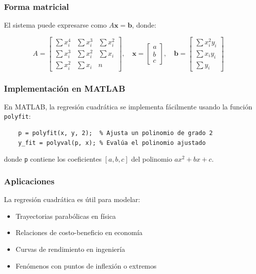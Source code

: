 \documentclass[12pt,a4paper]{article}
\begin{document}
\subsubsection{Forma matricial}

El sistema puede expresarse como $A\mathbf{x} = \mathbf{b}$, donde:

\begin{equation}
    A = \begin{bmatrix}
        \sum x_i^4 & \sum x_i^3 & \sum x_i^2 \\
        \sum x_i^3 & \sum x_i^2 & \sum x_i \\
        \sum x_i^2 & \sum x_i & n
    \end{bmatrix}, \quad
    \mathbf{x} = \begin{bmatrix} a \\ b \\ c \end{bmatrix}, \quad
    \mathbf{b} = \begin{bmatrix} \sum x_i^2 y_i \\ \sum x_i y_i \\ \sum y_i \end{bmatrix}
\end{equation}

\subsubsection{Implementación en MATLAB}

En MATLAB, la regresión cuadrática se implementa fácilmente usando la función \texttt{polyfit}:

\begin{verbatim}
    p = polyfit(x, y, 2);  % Ajusta un polinomio de grado 2
    y_fit = polyval(p, x); % Evalúa el polinomio ajustado
\end{verbatim}

donde \texttt{p} contiene los coeficientes $[a, b, c]$ del polinomio $ax^2 + bx + c$.

\subsubsection{Aplicaciones}

La regresión cuadrática es útil para modelar:
\begin{itemize}
    \item Trayectorias parabólicas en física
    \item Relaciones de costo-beneficio en economía
    \item Curvas de rendimiento en ingeniería
    \item Fenómenos con puntos de inflexión o extremos
\end{itemize}
\end{document}
